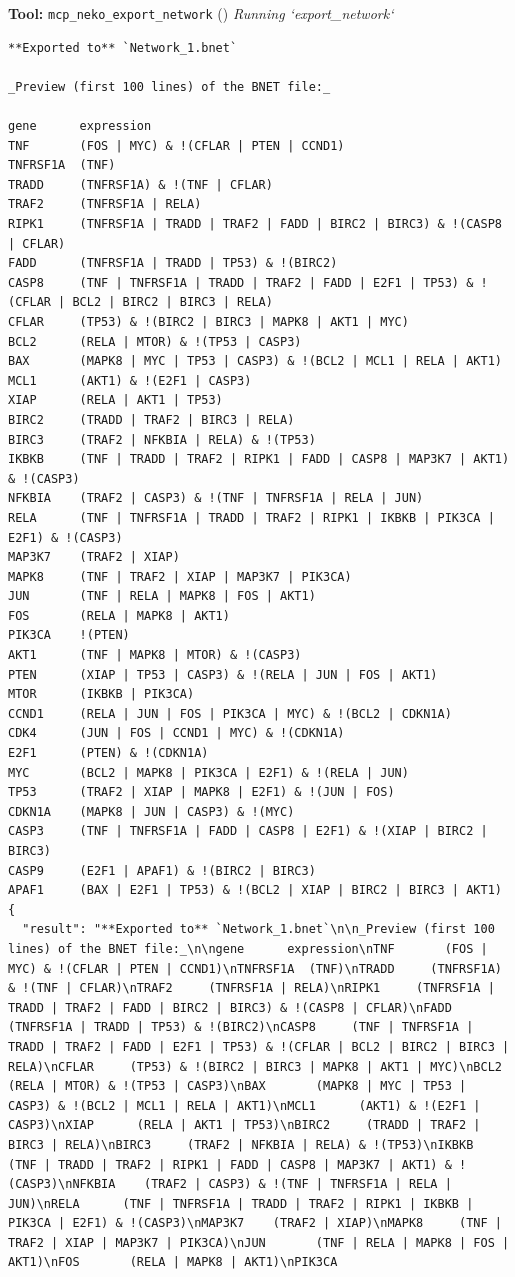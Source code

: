 \documentclass[11pt,a4paper]{article}
\begin{document}
\begin{toolokbox}
\textbf{Tool:} \texttt{mcp\_neko\_export\_network} (\checkmark)
\textit{Running `export\_network`}
\begin{lstlisting}
**Exported to** `Network_1.bnet`

_Preview (first 100 lines) of the BNET file:_

gene      expression
TNF       (FOS | MYC) & !(CFLAR | PTEN | CCND1)
TNFRSF1A  (TNF)
TRADD     (TNFRSF1A) & !(TNF | CFLAR)
TRAF2     (TNFRSF1A | RELA)
RIPK1     (TNFRSF1A | TRADD | TRAF2 | FADD | BIRC2 | BIRC3) & !(CASP8 | CFLAR)
FADD      (TNFRSF1A | TRADD | TP53) & !(BIRC2)
CASP8     (TNF | TNFRSF1A | TRADD | TRAF2 | FADD | E2F1 | TP53) & !(CFLAR | BCL2 | BIRC2 | BIRC3 | RELA)
CFLAR     (TP53) & !(BIRC2 | BIRC3 | MAPK8 | AKT1 | MYC)
BCL2      (RELA | MTOR) & !(TP53 | CASP3)
BAX       (MAPK8 | MYC | TP53 | CASP3) & !(BCL2 | MCL1 | RELA | AKT1)
MCL1      (AKT1) & !(E2F1 | CASP3)
XIAP      (RELA | AKT1 | TP53)
BIRC2     (TRADD | TRAF2 | BIRC3 | RELA)
BIRC3     (TRAF2 | NFKBIA | RELA) & !(TP53)
IKBKB     (TNF | TRADD | TRAF2 | RIPK1 | FADD | CASP8 | MAP3K7 | AKT1) & !(CASP3)
NFKBIA    (TRAF2 | CASP3) & !(TNF | TNFRSF1A | RELA | JUN)
RELA      (TNF | TNFRSF1A | TRADD | TRAF2 | RIPK1 | IKBKB | PIK3CA | E2F1) & !(CASP3)
MAP3K7    (TRAF2 | XIAP)
MAPK8     (TNF | TRAF2 | XIAP | MAP3K7 | PIK3CA)
JUN       (TNF | RELA | MAPK8 | FOS | AKT1)
FOS       (RELA | MAPK8 | AKT1)
PIK3CA    !(PTEN)
AKT1      (TNF | MAPK8 | MTOR) & !(CASP3)
PTEN      (XIAP | TP53 | CASP3) & !(RELA | JUN | FOS | AKT1)
MTOR      (IKBKB | PIK3CA)
CCND1     (RELA | JUN | FOS | PIK3CA | MYC) & !(BCL2 | CDKN1A)
CDK4      (JUN | FOS | CCND1 | MYC) & !(CDKN1A)
E2F1      (PTEN) & !(CDKN1A)
MYC       (BCL2 | MAPK8 | PIK3CA | E2F1) & !(RELA | JUN)
TP53      (TRAF2 | XIAP | MAPK8 | E2F1) & !(JUN | FOS)
CDKN1A    (MAPK8 | JUN | CASP3) & !(MYC)
CASP3     (TNF | TNFRSF1A | FADD | CASP8 | E2F1) & !(XIAP | BIRC2 | BIRC3)
CASP9     (E2F1 | APAF1) & !(BIRC2 | BIRC3)
APAF1     (BAX | E2F1 | TP53) & !(BCL2 | XIAP | BIRC2 | BIRC3 | AKT1)
{
  "result": "**Exported to** `Network_1.bnet`\n\n_Preview (first 100 lines) of the BNET file:_\n\ngene      expression\nTNF       (FOS | MYC) & !(CFLAR | PTEN | CCND1)\nTNFRSF1A  (TNF)\nTRADD     (TNFRSF1A) & !(TNF | CFLAR)\nTRAF2     (TNFRSF1A | RELA)\nRIPK1     (TNFRSF1A | TRADD | TRAF2 | FADD | BIRC2 | BIRC3) & !(CASP8 | CFLAR)\nFADD      (TNFRSF1A | TRADD | TP53) & !(BIRC2)\nCASP8     (TNF | TNFRSF1A | TRADD | TRAF2 | FADD | E2F1 | TP53) & !(CFLAR | BCL2 | BIRC2 | BIRC3 | RELA)\nCFLAR     (TP53) & !(BIRC2 | BIRC3 | MAPK8 | AKT1 | MYC)\nBCL2      (RELA | MTOR) & !(TP53 | CASP3)\nBAX       (MAPK8 | MYC | TP53 | CASP3) & !(BCL2 | MCL1 | RELA | AKT1)\nMCL1      (AKT1) & !(E2F1 | CASP3)\nXIAP      (RELA | AKT1 | TP53)\nBIRC2     (TRADD | TRAF2 | BIRC3 | RELA)\nBIRC3     (TRAF2 | NFKBIA | RELA) & !(TP53)\nIKBKB     (TNF | TRADD | TRAF2 | RIPK1 | FADD | CASP8 | MAP3K7 | AKT1) & !(CASP3)\nNFKBIA    (TRAF2 | CASP3) & !(TNF | TNFRSF1A | RELA | JUN)\nRELA      (TNF | TNFRSF1A | TRADD | TRAF2 | RIPK1 | IKBKB | PIK3CA | E2F1) & !(CASP3)\nMAP3K7    (TRAF2 | XIAP)\nMAPK8     (TNF | TRAF2 | XIAP | MAP3K7 | PIK3CA)\nJUN       (TNF | RELA | MAPK8 | FOS | AKT1)\nFOS       (RELA | MAPK8 | AKT1)\nPIK3CA   

\end{lstlisting}
\end{toolokbox}
\end{document}
